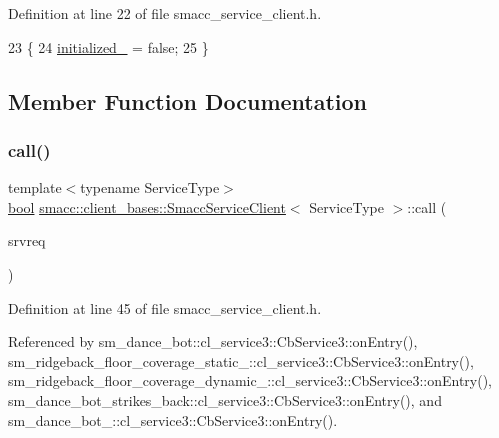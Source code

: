 Definition at line 22 of file smacc\+\_\+service\+\_\+client.\+h.


\begin{DoxyCode}
23     \{
24         \hyperlink{classsmacc_1_1client__bases_1_1SmaccServiceClient_ad36816c62fc14380a6d0782a2592a5b4}{initialized\_} = \textcolor{keyword}{false};
25     \}
\end{DoxyCode}


\subsection{Member Function Documentation}
\mbox{\label{classsmacc_1_1client__bases_1_1SmaccServiceClient_a0e9914f45f1091c38bb9ad6187d07977}} 
\subsubsection{\texorpdfstring{call()}{call()}}
{\footnotesize\ttfamily template$<$typename Service\+Type$>$ \\
\hyperlink{classbool}{bool} \hyperlink{classsmacc_1_1client__bases_1_1SmaccServiceClient}{smacc\+::client\+\_\+bases\+::\+Smacc\+Service\+Client}$<$ Service\+Type $>$\+::call (\begin{DoxyParamCaption}\item[{Service\+Type \&}]{srvreq }\end{DoxyParamCaption})\hspace{0.3cm}{\ttfamily [inline]}}



Definition at line 45 of file smacc\+\_\+service\+\_\+client.\+h.



Referenced by sm\+\_\+dance\+\_\+bot\+::cl\+\_\+service3\+::\+Cb\+Service3\+::on\+Entry(), sm\+\_\+ridgeback\+\_\+floor\+\_\+coverage\+\_\+static\+\_\+::cl\+\_\+service3\+::\+Cb\+Service3\+::on\+Entry(), sm\+\_\+ridgeback\+\_\+floor\+\_\+coverage\+\_\+dynamic\+\_\+::cl\+\_\+service3\+::\+Cb\+Service3\+::on\+Entry(), sm\+\_\+dance\+\_\+bot\+\_\+strikes\+\_\+back\+::cl\+\_\+service3\+::\+Cb\+Service3\+::on\+Entry(), and sm\+\_\+dance\+\_\+bot\+\_\+::cl\+\_\+service3\+::\+Cb\+Service3\+::on\+Entry().


